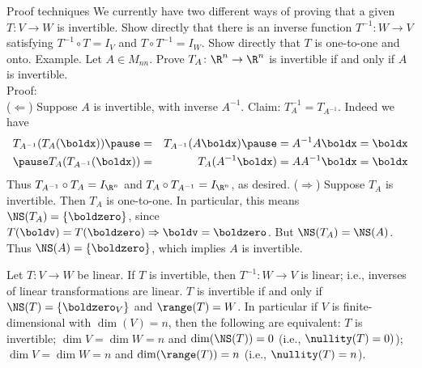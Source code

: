 \begin{frame}{Proof techniques}
\footnotesize
We currently have two different ways of proving that a given $T\colon V\rightarrow W$ is invertible. 
\bb
\ii Show directly that there is an inverse function $T^{-1}\colon W\rightarrow V$ satisfying $T^{-1}\circ T=I_V$ and $T\circ T^{-1}=I_W$. 
\ii Show directly that $T$ is one-to-one and onto. 
\ee
\pause
\alert{Example}. Let $A\in M_{nn}$. Prove $T_A\colon\R^n\rightarrow\R^n$ is invertible if and only if $A$ is invertible. 
\\
\pause Proof: \\
\alert{($\Leftarrow$)} Suppose $A$ is invertible, with inverse $A^{-1}$. Claim: $T_A^{-1}=T_{A^{-1}}$. Indeed we have 
\begin{eqnarray*}
T_{A^{-1}}(T_A(\boldx))\pause&=&T_{A^{-1}}(A\boldx)\pause=A^{-1}A\boldx=\boldx\\
\pause T_{A}(T_{A^{-1}}(\boldx))&=&T_{A}(A^{-1}\boldx)=AA^{-1}\boldx=\boldx
\end{eqnarray*}
\pause Thus $T_{A^{-1}}\circ T_A=I_{\R^n}$ and $T_A\circ T_{A^{-1}}=I_{\R^n}$, as desired. 
\bpause
\alert{($\Rightarrow$)} Suppose $T_{A}$ is invertible. Then $T_A$ is one-to-one. In particular, this means $\NS(T_A)=\{\boldzero\}$, since $T(\boldv)=T(\boldzero)\Rightarrow \boldv=\boldzero$. But $\NS(T_A)=\NS(A)$. Thus $\NS(A)=\{\boldzero\}$, which implies $A$ is invertible. 
\end{frame}
\begin{frame}
\footnotesize
\begin{theorem}
Let $T\colon V\rightarrow W$ be linear. 
\bb[(a)]
\ii If $T$ is invertible, then $T^{-1}\colon W\rightarrow V$ is linear; i.e., inverses of linear transformations are linear. 
\pause
\ii $T$ is invertible if and only if $\NS(T)=\{\boldzero_V\}$ and $\range(T)=W$. 
\ee 
\pause In particular if $V$ is finite-dimensional with $\dim(V)=n$, then the following are equivalent:
\bb[(i)]
\ii $T$ is invertible;
\ii $\dim V=\dim W=n$ and $\dim(\NS(T))=0$ (i.e., $\nullity(T)=0)$);
\ii $\dim V=\dim W=n$ and $\dim(\range(T))=n$ (i.e., $\nullity(T)=n$).
\ee
\end{theorem}
\end{frame}

